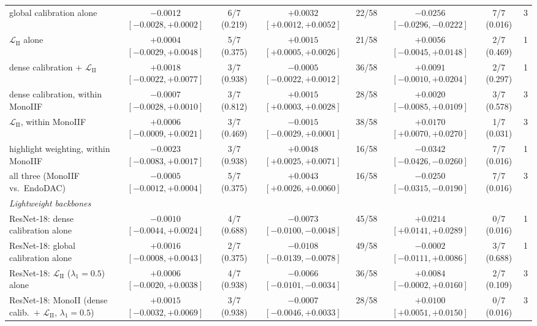 \documentclass[a4paper,fleqn]{cas-dc}
\begin{document}
{\begin{table}[t]
{\begin{tabular}{@{}lccccccc@{}}
global calibration alone & $-0.0012$ $[-0.0028, +0.0002]$ & 6/7 (0.219) & $\mathbf{+0.0032}$ $[+0.0012, +0.0052]$ & 22/58 & $\mathbf{-0.0256}$ $[-0.0296, -0.0222]$ & 7/7 (0.016) & 3 \\
$\mathcal{L}_\textrm{II}$ alone & $+0.0004$ $[-0.0029, +0.0048]$ & 5/7 (0.375) & $\mathbf{+0.0015}$ $[+0.0005, +0.0026]$ & 21/58 & $+0.0056$ $[-0.0045, +0.0148]$ & 2/7 (0.469) & 1 \\
dense calibration $+$ $\mathcal{L}_\textrm{II}$ & $+0.0018$ $[-0.0022, +0.0077]$ & 3/7 (0.938) & $-0.0005$ $[-0.0022, +0.0012]$ & 36/58 & $+0.0091$ $[-0.0010, +0.0204]$ & 2/7 (0.297) & 1 \\
dense calibration, within MonoIIF & $-0.0007$ $[-0.0028, +0.0010]$ & 3/7 (0.812) & $\mathbf{+0.0015}$ $[+0.0003, +0.0028]$ & 28/58 & $+0.0020$ $[-0.0085, +0.0109]$ & 3/7 (0.578) & 3 \\
$\mathcal{L}_\textrm{II}$, within MonoIIF & $+0.0006$ $[-0.0009, +0.0021]$ & 3/7 (0.469) & $-0.0015$ $[-0.0029, +0.0001]$ & 38/58 & $\mathbf{+0.0170}$ $[+0.0070, +0.0270]$ & 1/7 (0.031) & 3 \\
highlight weighting, within MonoIIF & $-0.0023$ $[-0.0083, +0.0017]$ & 3/7 (0.938) & $\mathbf{+0.0048}$ $[+0.0025, +0.0071]$ & 16/58 & $\mathbf{-0.0342}$ $[-0.0426, -0.0260]$ & 7/7 (0.016) & 1 \\
all three (MonoIIF vs.\ EndoDAC) & $-0.0005$ $[-0.0012, +0.0004]$ & 5/7 (0.375) & $\mathbf{+0.0043}$ $[+0.0026, +0.0060]$ & 16/58 & $\mathbf{-0.0250}$ $[-0.0315, -0.0190]$ & 7/7 (0.016) & 3 \\
\midrule
\multicolumn{8}{l}{\emph{Lightweight backbones}} \\
ResNet-18: dense calibration alone & $-0.0010$ $[-0.0044, +0.0024]$ & 4/7 (0.688) & $\mathbf{-0.0073}$ $[-0.0100, -0.0048]$ & 45/58 & $\mathbf{+0.0214}$ $[+0.0141, +0.0289]$ & 0/7 (0.016) & 1 \\
ResNet-18: global calibration alone & $+0.0016$ $[-0.0008, +0.0043]$ & 2/7 (0.375) & $\mathbf{-0.0108}$ $[-0.0139, -0.0078]$ & 49/58 & $-0.0002$ $[-0.0111, +0.0086]$ & 3/7 (0.688) & 1 \\
ResNet-18: $\mathcal{L}_\textrm{II}$ ($\lambda_1{=}0.5$) alone & $+0.0006$ $[-0.0020, +0.0038]$ & 4/7 (0.938) & $\mathbf{-0.0066}$ $[-0.0101, -0.0034]$ & 36/58 & $+0.0084$ $[-0.0002, +0.0160]$ & 2/7 (0.109) & 3 \\
ResNet-18: MonoII (dense calib.\ $+$ $\mathcal{L}_\textrm{II}$, $\lambda_1{=}0.5$) & $+0.0015$ $[-0.0032, +0.0069]$ & 3/7 (0.938) & $-0.0007$ $[-0.0046, +0.0033]$ & 28/58 & $\mathbf{+0.0100}$ $[+0.0051, +0.0150]$ & 0/7 (0.016) & 3 \\

\end{tabular}}
\end{table}}
\end{document}
